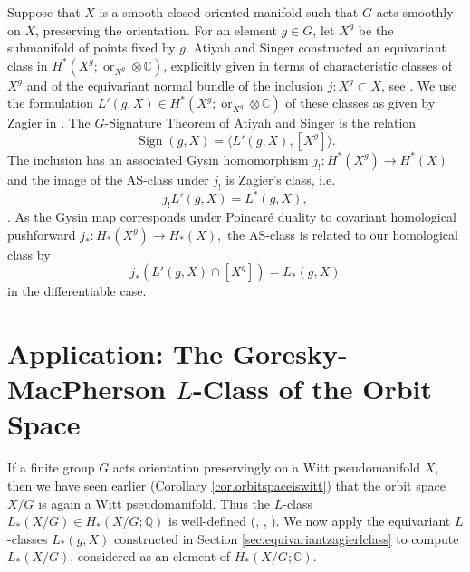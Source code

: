 \documentclass{amsart}
\theoremstyle{definition}
\theoremstyle{remark}
\newcommand {\cplx}  {\ensuremath{\mathbb{C}}}
\newcommand {\rat}   {\ensuremath{\mathbb{Q}}}
\newcommand {\Sign}    {{\ensuremath{\operatorname{Sign}}}}
\begin{document}
Suppose that $X$ is a smooth closed oriented manifold such that
$G$ acts smoothly on $X$, preserving the orientation.
For an element $g\in G$, let $X^g$ be the submanifold of points fixed by $g$.
Atiyah and Singer constructed an equivariant class
in $H^* (X^g; \operatorname{or}_{X^g} \otimes \cplx)$,
explicitly given in terms of characteristic
classes of $X^g$ and of the equivariant normal bundle of the inclusion
$j: X^g \subset X$, see \cite[p. 582]{atiyahsinger}. 
We use the formulation $L' (g,X) \in H^* (X^g; \operatorname{or}_{X^g} \otimes \cplx)$ 
of these classes
as given by Zagier in \cite[p. 12, (27)]{zagier}.
The $G$-Signature Theorem of Atiyah and Singer is the relation
\[ \Sign (g,X) = \langle L' (g,X), [X^g] \rangle. \] 
The inclusion has an associated Gysin homomorphism
$j_!: H^* (X^g) \to H^* (X)$ and the image of the AS-class under $j_!$
is Zagier's class, i.e.
\[ j_! L'(g,X) = L^* (g,X), \]
\cite[p. 4, (3); p. 21, Thm. 1]{zagier}.
As the Gysin map corresponds under Poincar\'e duality to covariant
homological pushforward $j_*: H_* (X^g) \to H_* (X),$ the AS-class
is related to our homological class by
\[ j_* (L'(g,X) \cap [X^g]) = L_* (g,X)  \]
in the differentiable case.







\section{Application: The Goresky-MacPherson $L$-Class of the Orbit Space}
\label{sec.lclassorbitspace}

If a finite group $G$ acts orientation preservingly 
on a Witt pseudomanifold $X$, then we have seen earlier
(Corollary \ref{cor.orbitspaceiswitt})
that the orbit space $X/G$ is again a Witt pseudomanifold. 
Thus the $L$-class $L_* (X/G) \in H_* (X/G;\rat)$
is well-defined (\cite{gmih1}, \cite{siegel}, \cite{curran}). 
We now apply the equivariant $L$-classes
$L_* (g,X)$ constructed in Section \ref{sec.equivariantzagierlclass}
to compute $L_* (X/G)$, considered as an element of $H_* (X/G;\cplx)$.
\end{document}
